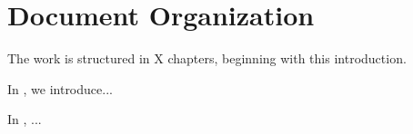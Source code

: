 \section{Document Organization}

The work is structured in X chapters, beginning with this introduction.

In , we introduce...

In , ...




















